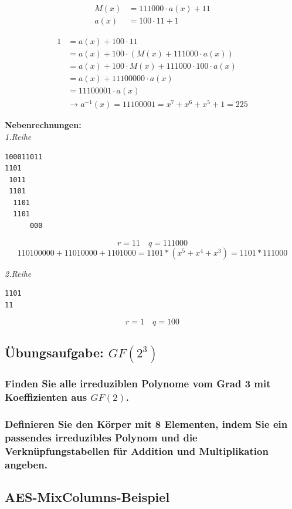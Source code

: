 \begin{align*}
M(x) &= {111000} \cdot a(x) + {11} \\
a(x) &= {100} \cdot {11} + {1}
\end{align*}

\begin{align}
{1} &= a(x) + {100} \cdot {11}                                                \\
    &= a(x) + {100} \cdot (M(x) + {111000} \cdot a(x)) \\ 
    &= a(x) + {100} \cdot M(x) + {111000} \cdot {100} \cdot a(x) \\
    &= a(x) + {11100000} \cdot a(x) \\ 
    &= {11100001} \cdot a(x)   \\ 
    &\rightarrow a^{-1}(x) = {11100001} = x^7 + x^6 + x^5 + 1 = {225}
\end{align}

\noindent
\textbf{Nebenrechnungen:} \\
\noindent
\textit{1.Reihe}
\begin{verbatim}
100011011
1101     
 1011
 1101
  1101               
  1101 
      000 
\end{verbatim}
\[ r = 11 \quad q = 111000 \]
\[ 110100000 + 11010000 + 1101000 = 1101 * (x^5+x^4+x^3) = 1101 * 111000 \]

\noindent
\textit{2.Reihe}
\begin{verbatim}
1101
11
\end{verbatim}
\[ r = 1 \quad q = 100 \]

\subsection{Übungsaufgabe: $GF(2^3)$}
\subsubsection{Finden Sie alle irreduziblen Polynome vom Grad 3 mit Koeffizienten aus
$GF(2)$.}
\subsubsection{Definieren Sie den Körper mit 8 Elementen, indem Sie ein passendes
irreduzibles Polynom und die Verknüpfungstabellen für Addition und
Multiplikation angeben.}

\subsection{AES-MixColumns-Beispiel}
